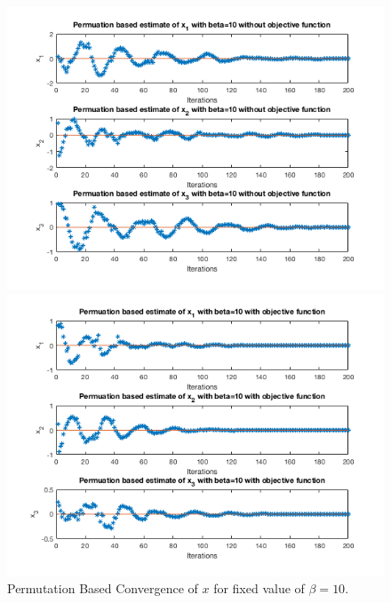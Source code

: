 \documentclass[answers]{exam}
\begin{document}
\begin{itemize}
\begin{framed}
\begin{figure}[H]
    \centering
    \caption{Permutation Based Convergence of $x$ for fixed value of $\beta=10$.}
    \begin{minipage}{.5\textwidth}
        \centering
        \includegraphics[width=1.1\textwidth, height=0.3\textheight]{Problem7_111.png}
    \end{minipage}%
    \begin{minipage}{0.5\textwidth}
        \centering
        \includegraphics[width=1.1\textwidth, height=0.3\textheight]{Problem7_112.png}
    \end{minipage}
    \label{p10}
\end{figure}



\end{framed}
\end{itemize}
\end{document}
